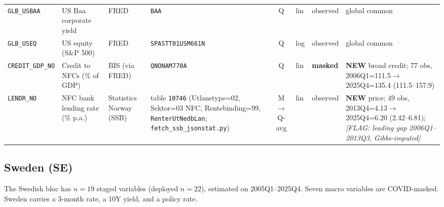 {\begin{longtable}{@{}lp{2.9cm}p{1.9cm}p{2.0cm}cp{1.4cm}p{1.7cm}p{2.6cm}@{}}
\texttt{GLB\_USBAA} & US Baa corporate yield & FRED & \texttt{BAA} & Q & lin & observed & global common\\
\texttt{GLB\_USEQ} & US equity (S\&P 500) & FRED & \texttt{SPASTT01USM661N} & Q & log & observed & global common\\
\texttt{CREDIT\_GDP\_NO} & Credit to NFCs (\% of GDP) & BIS (via FRED) & \texttt{QNONAM770A} & Q & lin & \textbf{masked} & \textbf{NEW} broad credit; 77 obs, 2006Q1=111.5$\to$2025Q4=135.4 (111.5--157.9)\\
\texttt{LENDR\_NO} & NFC bank lending rate (\% p.a.) & Statistics Norway (SSB) & table \texttt{10746} (Utlanstype=02, Sektor=03 NFC, Rentebinding=99, \texttt{RenterUtNedbLan}; \texttt{fetch\_ssb\_jsonstat.py}) & M$\to$Q-avg & lin & observed & \textbf{NEW} price; 49 obs, 2013Q4=4.13$\to$2025Q4=6.20 (2.42--6.81); \textit{[FLAG: leading gap 2006Q1--2013Q3, Gibbs-imputed]}\\
\end{longtable}}

\subsection{Sweden (SE)}\label{sec:data:SE}

The Swedish bloc has $n=19$ staged variables (deployed $n=22$), estimated on
2005Q1--2025Q4. Seven macro variables are COVID-masked. Sweden carries a
3-month rate, a 10Y yield, and a policy rate.

